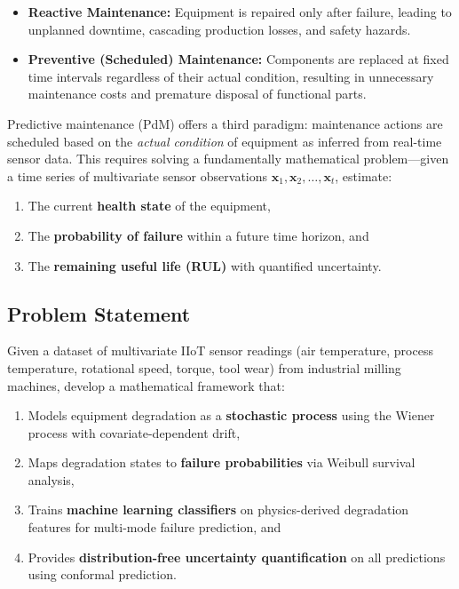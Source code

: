 \documentclass[12pt, a4paper]{article}
\begin{document}
\begin{itemize}[leftmargin=*]
    \item \textbf{Reactive Maintenance:} Equipment is repaired only after failure, leading to unplanned downtime, cascading production losses, and safety hazards.
    \item \textbf{Preventive (Scheduled) Maintenance:} Components are replaced at fixed time intervals regardless of their actual condition, resulting in unnecessary maintenance costs and premature disposal of functional parts.
\end{itemize}

Predictive maintenance (PdM) offers a third paradigm: maintenance actions are scheduled based on the \textit{actual condition} of equipment as inferred from real-time sensor data. This requires solving a fundamentally mathematical problem---given a time series of multivariate sensor observations $\mathbf{x}_1, \mathbf{x}_2, \ldots, \mathbf{x}_t$, estimate:

\begin{enumerate}
    \item The current \textbf{health state} of the equipment,
    \item The \textbf{probability of failure} within a future time horizon, and
    \item The \textbf{remaining useful life (RUL)} with quantified uncertainty.
\end{enumerate}

\subsection{Problem Statement}

Given a dataset of multivariate IIoT sensor readings (air temperature, process temperature, rotational speed, torque, tool wear) from industrial milling machines, develop a mathematical framework that:

\begin{enumerate}
    \item Models equipment degradation as a \textbf{stochastic process} using the Wiener process with covariate-dependent drift,
    \item Maps degradation states to \textbf{failure probabilities} via Weibull survival analysis,
    \item Trains \textbf{machine learning classifiers} on physics-derived degradation features for multi-mode failure prediction, and
    \item Provides \textbf{distribution-free uncertainty quantification} on all predictions using conformal prediction.
\end{enumerate}
\end{document}
